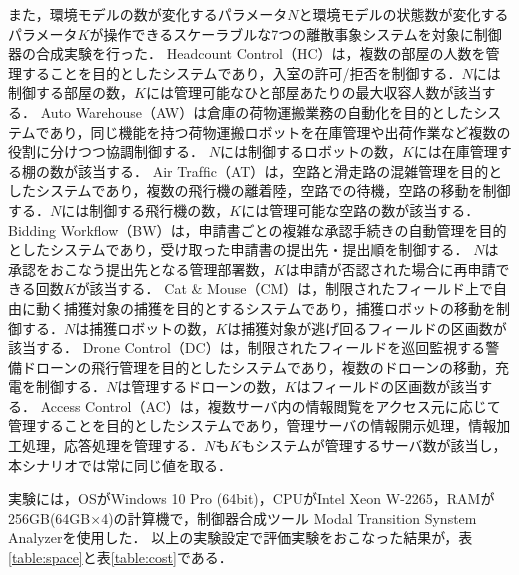 また，環境モデルの数が変化するパラメータ$N$と環境モデルの状態数が変化するパラメータ$K$が操作できるスケーラブルな7つの離散事象システムを対象に制御器の合成実験を行った．
Headcount Control（HC）\cite{paper:ArtGallery}は，複数の部屋の人数を管理することを目的としたシステムであり，入室の許可/拒否を制御する．$N$には制御する部屋の数，$K$には管理可能なひと部屋あたりの最大収容人数が該当する．
Auto Warehouse（AW）\cite{paper:KIVA_System}は倉庫の荷物運搬業務の自動化を目的としたシステムであり，同じ機能を持つ荷物運搬ロボットを在庫管理や出荷作業など複数の役割に分けつつ協調制御する．
$N$には制御するロボットの数，$K$には在庫管理する棚の数が該当する．
Air Trafﬁc（AT）\cite{paper:DES}は，空路と滑走路の混雑管理を目的としたシステムであり，複数の飛行機の離着陸，空路での待機，空路の移動を制御する．$N$には制御する飛行機の数，$K$には管理可能な空路の数が該当する．
Bidding Workflow（BW）\cite{paper:DES}は，申請書ごとの複雑な承認手続きの自動管理を目的としたシステムであり，受け取った申請書の提出先・提出順を制御する．
$N$は承認をおこなう提出先となる管理部署数，$K$は申請が否認された場合に再申請できる回数$K$が該当する．
Cat \& Mouse（CM）\cite{paper:DES}は，制限されたフィールド上で自由に動く捕獲対象の捕獲を目的とするシステムであり，捕獲ロボットの移動を制御する．$N$は捕獲ロボットの数，$K$は捕獲対象が逃げ回るフィールドの区画数が該当する．
Drone Control（DC）\cite{yamauchi:ICCSCE2023}\cite{yamauchi:SESOS2023}は，制限されたフィールドを巡回監視する警備ドローンの飛行管理を目的としたシステムであり，複数のドローンの移動，充電を制御する．$N$は管理するドローンの数，$K$はフィールドの区画数が該当する．
Access Control（AC）\cite{yamauchi:AIKE2020}は，複数サーバ内の情報閲覧をアクセス元に応じて管理することを目的としたシステムであり，管理サーバの情報開示処理，情報加工処理，応答処理を管理する．$N$も$K$もシステムが管理するサーバ数が該当し，本シナリオでは常に同じ値を取る．

実験には，OSがWindows 10 Pro (64bit)，CPUがIntel Xeon W-2265，RAMが256GB(64GB×4)の計算機で，制御器合成ツール Modal Transition Synstem Analyzer\cite{paper:MTSA}を使用した．
以上の実験設定で評価実験をおこなった結果が，表\ref{table:space}と表\ref{table:cost}である．


